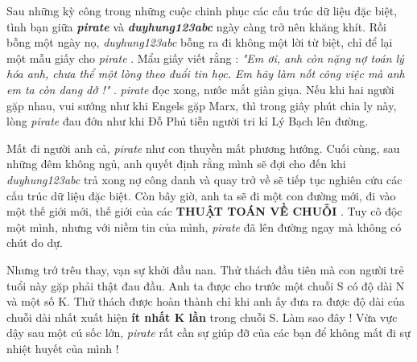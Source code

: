 Sau những kỳ công trong những cuộc chinh phục các cấu trúc dữ liệu đặc biệt, tình bạn giữa   \textbf{\emph{     pirate    }}   và   \textbf{\emph{     duyhung123abc    }}   ngày càng trở nên khăng khít. Rồi bỗng một ngày nọ,   \emph{    duyhung123abc   }   bỗng ra đi không một lời từ biệt, chỉ để lại một mẫu giấy cho   \emph{    pirate   }   . Mẩu giấy viết rằng :   \emph{    "Em ơi, anh còn nặng nợ toán lý hóa anh, chưa thể một lòng theo đuổi tin học. Em hãy làm nốt công việc mà anh em ta còn dang dở !"   }   .   \emph{    pirate   }   đọc xong, nước mắt giàn giụa. Nếu khi hai người gặp nhau, vui sướng như khi Engels gặp Marx, thì trong giây phút chia ly này, lòng   \emph{    pirate   }   đau đớn như khi Đỗ Phủ tiễn người tri kỉ Lý Bạch lên đường.  

   Mất đi người anh cả,   \emph{    pirate   }   như con thuyền mất phương hướng. Cuối cùng, sau những đêm không ngủ, anh quyết định rằng mình sẽ đợi cho đến khi   \emph{    duyhung123abc   }   trả xong nợ công danh và quay trở về sẽ tiếp tục nghiên cứu các cấu trúc dữ liệu đặc biệt. Còn bây giờ, anh ta sẽ đi một con đường mới, đi vào một thế giới mới, thế giới của các   \textbf{    THUẬT TOÁN VỀ CHUỖI   }   . Tuy cô độc một mình, nhưng với niềm tin của mình,   \emph{    pirate   }   đã lên đường ngay mà không có chút do dự.  

   Nhưng trớ trêu thay, vạn sự khởi đầu nan. Thử thách đầu tiên mà con người trẻ tuổi này gặp phải thật đau đầu. Anh ta được cho trước một chuỗi S có độ dài N và một số K. Thử thách được hoàn thành chỉ khi anh ấy đưa ra được độ dài của chuỗi dài nhất xuất hiện   \textbf{    ít nhất K lần   }   trong chuỗi S. Làm sao đây ! Vừa vực dậy sau một cú sốc lớn,   \emph{    pirate   }   rất cần sự giúp đỡ của các bạn để không mất đi sự nhiệt huyết của mình !